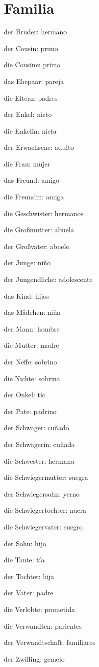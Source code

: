 \section{Familia}
\begin{multicols}{2}
\begin{myitemize}
\item der Bruder: hermano
\item der Cousin: primo
\item die Cousine: prima
\item das Ehepaar: pareja
\item die Eltern: padres
\item der Enkel: nieto
\item die Enkelin: nieta
\item der Erwachsene: adulto
\item die Frau: mujer
\item das Freund: amigo
\item die Freundin: amiga
\item die Geschwister: hermanos
\item die Großmutter: abuela
\item der Großvater: abuelo
\item der Junge: niño
\item der Jungendliche: adolescente
\item das Kind: hijos
\item das Mädchen: niña
\item der Mann: hombre
\item die Mutter: madre
\item der Neffe: sobrino
\item die Nichte: sobrina
\item der Onkel: tío
\item der Pate: padrino
\item der Schwager: cuñado
\item der Schwägerin: cuñada
\item die Schwester: hermana
\item die Schwiegermutter: suegra
\item der Schwiegersohn: yerno
\item die Schwiegertochter: nuera
\item die Schwiegervater: suegro
\item der Sohn: hijo
\item die Tante: tía
\item der Tochter: hija
\item der Vater: padre
\item die Verlobte: prometida
\item die Verwandten: parientes
\item der Verwandtschaft: familiares
\item der Zwilling: gemelo
\end{myitemize}
\end{multicols}

